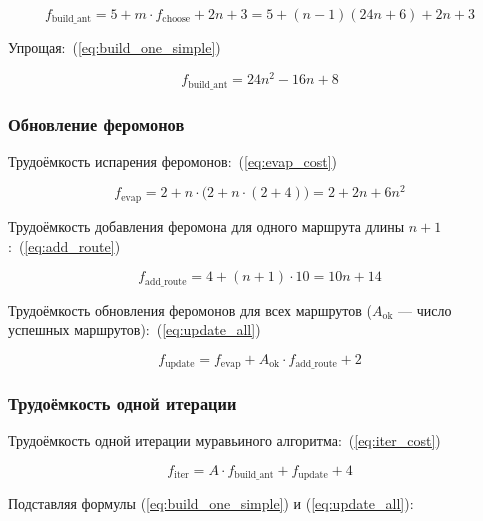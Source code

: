 \begin{equation}
	\label{eq:build_one}
	f_{\text{build\_ant}} = 5 + m \cdot f_{\text{choose}} + 2n + 3 = 5 + (n-1)(24n+6) + 2n + 3
\end{equation}

Упрощая:~(\ref{eq:build_one_simple})

\begin{equation}
	\label{eq:build_one_simple}
	f_{\text{build\_ant}} = 24n^2 - 16n + 8
\end{equation}

\subsubsection{Обновление феромонов}

Трудоёмкость испарения феромонов:~(\ref{eq:evap_cost})

\begin{equation}
	\label{eq:evap_cost}
	f_{\text{evap}} = 2 + n \cdot \bigl(2 + n \cdot (2 + 4)\bigr) = 2 + 2n + 6n^2
\end{equation}

Трудоёмкость добавления феромона для одного маршрута длины $n+1$:~(\ref{eq:add_route})

\begin{equation}
	\label{eq:add_route}
	f_{\text{add\_route}} = 4 + (n+1) \cdot 10 = 10n + 14
\end{equation}

Трудоёмкость обновления феромонов для всех маршрутов ($A_{\text{ok}}$ --- число успешных маршрутов):~(\ref{eq:update_all})

\begin{equation}
	\label{eq:update_all}
	f_{\text{update}} = f_{\text{evap}} + A_{\text{ok}} \cdot f_{\text{add\_route}} + 2
\end{equation}

\subsubsection{Трудоёмкость одной итерации}

Трудоёмкость одной итерации муравьиного алгоритма:~(\ref{eq:iter_cost})

\begin{equation}
	\label{eq:iter_cost}
	f_{\text{iter}} = A \cdot f_{\text{build\_ant}} + f_{\text{update}} + 4
\end{equation}

Подставляя формулы (\ref{eq:build_one_simple}) и (\ref{eq:update_all}):

